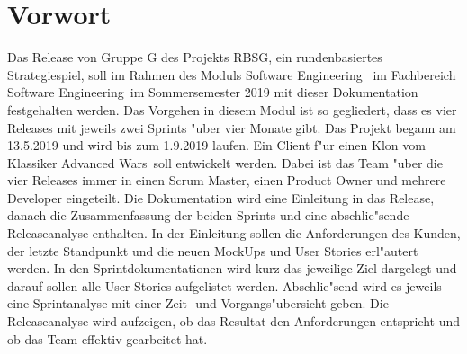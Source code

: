 \documentclass[12pt, titlepage]{scrartcl}
\newcommand{\RN}[1]{%
	\textup{\uppercase\expandafter{\romannumeral#1}}%
}
\begin{document}
	\section{Vorwort}
    	Das Release \RN{3} von Gruppe G des Projekts RBSG, ein rundenbasiertes Strategiespiel, soll im Rahmen des Moduls \glqq Software Engineering \RN{1}\grqq\ im Fachbereich \glqq Software Engineering\grqq\ im Sommersemester 2019 mit dieser Dokumentation festgehalten werden.
    	\vspace{0.3cm} \newline
        Das Vorgehen in diesem Modul ist so gegliedert, dass es vier Releases mit jeweils zwei Sprints "uber vier Monate gibt. Das Projekt begann am 13.5.2019 und wird bis zum 1.9.2019 laufen. Ein Client f"ur einen Klon vom Klassiker \glqq Advanced Wars\grqq\ soll entwickelt werden. Dabei ist das Team "uber die vier Releases immer in einen Scrum Master, einen Product Owner und mehrere Developer eingeteilt.
        \vspace{0.3cm} \newline
        Die Dokumentation wird eine Einleitung in das Release, danach die Zusammenfassung der beiden Sprints und eine abschlie"sende Releaseanalyse enthalten. In der Einleitung sollen die Anforderungen des Kunden, der letzte Standpunkt und die neuen MockUps und User Stories erl"autert werden. In den Sprintdokumentationen wird kurz das jeweilige Ziel dargelegt und darauf sollen alle User Stories aufgelistet werden. Abschlie"send wird es jeweils eine Sprintanalyse mit einer Zeit- und Vorgangs"ubersicht geben. Die Releaseanalyse wird aufzeigen, ob das Resultat den Anforderungen entspricht und ob das Team effektiv gearbeitet hat.
    \newpage
    \tableofcontents
    \newpage
\end{document}

